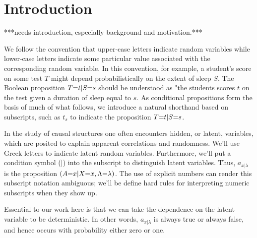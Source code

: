 
\section{Introduction}
***needs introduction, especially background and motivation.***


We follow the convention that upper-case letters indicate random variables while lower-case letters indicate some particular value associated with the corresponding random variable. In this convention, for example, a student's score on some test $T$ might depend probabilistically on the extent of sleep $S$. The Boolean proposition $T\cramp{=}t|S\cramp{=}s$ should be understood as "the students scores $t$ on the test given a duration of sleep equal to $s$. As conditional propositions form the basis of much of what follows, we introduce a natural shorthand based on subscripts, such as $t_s$ to indicate the proposition $T\cramp{=}t|S\cramp{=}s$. 

In the study of causal structures one often encounters hidden, or latent, variables, which are posited to explain apparent correlations and randomness. We'll use Greek letters to indicate latent random variables. Furthermore, we'll put a condition symbol ($|$) into the subscript to distinguish latent variables. Thus, $a_{x|\lambda}$ is the proposition $\parens*{A\cramp{=}x|X\cramp{=}x,\Lambda\cramp{=}\lambda}$. The use of explicit numbers can render this subscript notation ambiguous; we'll be define hard rules for interpreting numeric subscripts when they show up. 

Essential to our work here is that we can take the dependence on the latent variable to be deterministic. In other words,  $a_{x|\lambda}$ is always true or always false, and hence occurs with probability either zero or one. 


